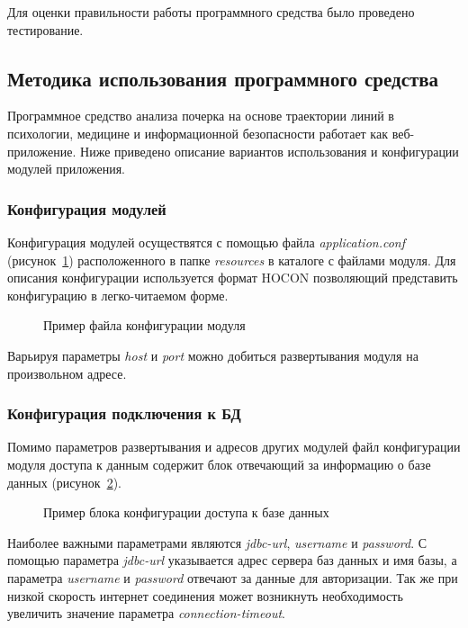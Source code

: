 Для оценки правильности работы программного средства было проведено тестирование.

\subsection{Методика использования программного средства}
\label{sec:manpage:admin_man}
Программное средство анализа почерка на основе траектории линий в психологии, медицине и информационной безопасности работает как веб-приложение. Ниже приведено описание вариантов использования и конфигурации модулей приложения.

\subsubsection{Конфигурация модулей}
Конфигурация модулей осуществятся с помощью файла \emph{application.conf} (рисунок~\ref{listing:manpage:admin_man:app_conf}) расположенного в папке \emph{resources} в каталоге с файлами модуля. Для описания конфигурации используется формат HOCON позволяющий представить конфигурацию в легко-читаемом форме. 

\begin{figure}[ht]
    \centering
    
    \caption{Пример файла конфигурации модуля}
    \label{listing:manpage:admin_man:app_conf}
\end{figure}     

Варьируя параметры \emph{host} и \emph{port} можно добиться развертывания модуля на произвольном адресе.

\subsubsection{Конфигурация подключения к БД}
Помимо параметров развертывания и адресов других модулей файл конфигурации модуля доступа к данным содержит блок отвечающий за информацию о базе данных (рисунок~\ref{listing:manpage:admin_man:db_conf}).

\begin{figure}[ht]
    \centering
    
    \caption{Пример блока конфигурации доступа к базе данных}
    \label{listing:manpage:admin_man:db_conf}
\end{figure}     

Наиболее важными параметрами являются \emph{jdbc-url}, \emph{username} и \emph{password}. С помощью параметра \emph{jdbc-url} указывается адрес сервера баз данных и имя базы, а параметра \emph{username} и \emph{password} отвечают за данные для авторизации. Так же при низкой скорость интернет соединения может возникнуть необходимость увеличить значение параметра \emph{connection-timeout}.

